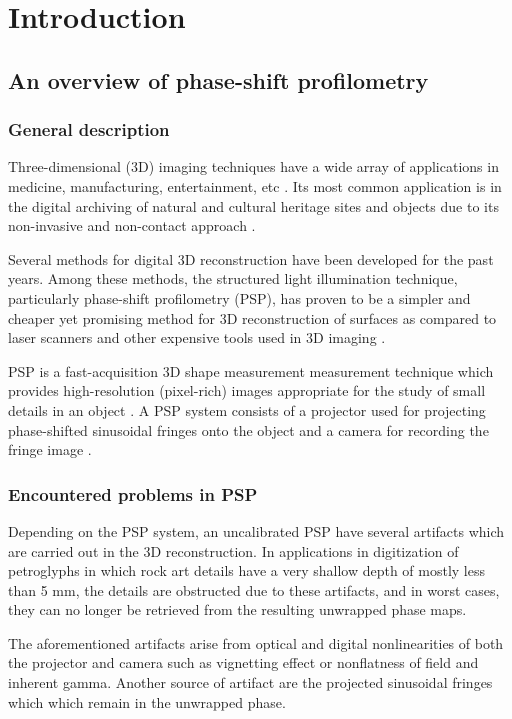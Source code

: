 \chapter{Introduction}

\section{An overview of phase-shift profilometry}
\subsection{General description}

Three-dimensional (3D) imaging techniques have a wide array of applications in medicine, manufacturing, entertainment, etc \cite{}. 
Its most common application is in the digital archiving of natural and cultural heritage sites and objects due to its non-invasive and non-contact approach \cite{Simon2013}. 

Several methods for digital 3D reconstruction have been developed for the past years. Among these methods, the structured light illumination technique, particularly phase-shift profilometry (PSP), has proven to be a simpler and cheaper yet promising method for 3D reconstruction of surfaces as compared to laser scanners and other expensive tools used in 3D imaging \cite{Zhang2002, Chrova200x}. 

PSP is a fast-acquisition 3D shape measurement measurement technique which provides high-resolution (pixel-rich) images appropriate for the study of small details in an object \cite{}. 
A PSP system consists of a projector used for projecting phase-shifted sinusoidal fringes onto the object and a camera for recording the fringe image \cite{}.

\subsection{Encountered problems in PSP}

Depending on the PSP system, an uncalibrated PSP have several artifacts which are carried out in the 3D reconstruction. 
In applications in digitization of petroglyphs in which rock art details have a very shallow depth of mostly less than 5 mm, the details are obstructed due to these artifacts, and in worst cases, they can no longer be retrieved from the resulting unwrapped phase maps.

The aforementioned artifacts arise from optical and digital nonlinearities of both the projector and camera such as vignetting effect or nonflatness of field and inherent gamma. 
Another source of artifact are the projected sinusoidal fringes which which remain in the unwrapped phase. 

